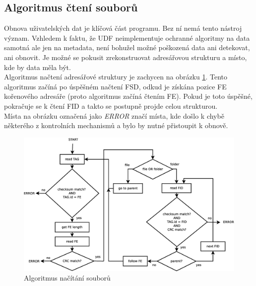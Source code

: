 \subsection{Algoritmus čtení souborů}
Obnova uživatelských dat je klíčová část programu. Bez ní nemá tento nástroj význam. Vzhledem k faktu, že UDF neimplementuje ochranné algoritmy na data samotná ale jen na metadata, není bohužel možné poškozená data ani detekovat, ani obnovit. Je možné se pokusit zrekonstruovat adresářovou strukturu a místo, kde by data měla být.\\
Algoritmus načtení adresářové struktury je zachycen na obrázku \ref{fig:files}. Tento algoritmus začíná po úspěšném načtení FSD, odkud je získána pozice FE kořenového adresáře (proto algoritmus začíná čtením FE). Pokud je toto úspěšné, pokračuje se k čtení FID a takto se postupně projde celou strukturou.\\
Místa na obrázku označená jako \textit{ERROR} značí místa, kde došlo k chybě některého z kontrolních mechanismů a bylo by nutné přistoupit k obnově. 
\begin{figure}[ht] 
    \centering
    \includegraphics[scale=0.36]{obrazky/files.eps}
    \caption{Algoritmus načítání souborů}
    \label{fig:files}
\end{figure}

